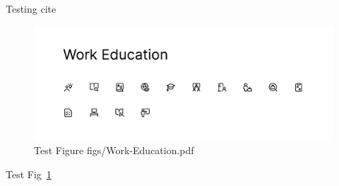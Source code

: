 Testing cite~\cite{nano}

\begin{figure}[t]
\includegraphics[width=\linewidth]{../figs/Work-Education.pdf}
\caption{Test Figure figs/Work-Education.pdf}
\label{fig:test}
\end{figure}

Test Fig~\ref{fig:test}